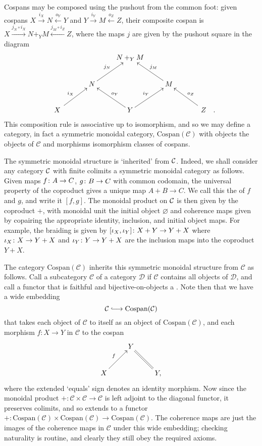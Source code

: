 Cospans may be composed using the pushout from the common
foot: given cospans $X \stackrel{i_X}{\longrightarrow} N
\stackrel{o_Y}{\longleftarrow} Y$ and $Y \stackrel{i_Y}{\longrightarrow} M
\stackrel{o_Z}{\longleftarrow} Z$, their composite cospan is $X \xrightarrow{j_N
\circ i_X} N+_YM \xleftarrow{j_M\circ i_Z} Z$,
where the maps $j$ are given by the pushout square in the diagram
\[
  \xymatrix{
    && N+_YM \\
    & N \ar[ur]^{j_N} && M \ar[ul]_{j_M} \\
    \quad X \quad \ar[ur]^{i_X} && Y \ar[ul]_{o_Y} \ar[ur]^{i_Y} && \quad Z
    \quad \ar[ul]_{o_Z}.
  }
\]
This composition rule is associative up to isomorphism, and
so we may define a category, in fact a symmetric monoidal category,
$\mathrm{Cospan}(\mathcal C)$ with objects the objects of $\mathcal C$ and
morphisms isomorphism classes of cospans. 

The symmetric monoidal structure is `inherited' from $\mathcal C$. Indeed, we shall
consider any category $\mathcal C$ with finite colimits a symmetric monoidal category
as follows. Given maps $f {\colon} A \to C$, $g {\colon} B \to C$ with common
codomain, the universal property of the coproduct gives a unique map $A+B \to
C$. We call this the  of $f$ and $g$, and write it $[f,g]$. The
monoidal product on $\mathcal C$ is then given by the coproduct $+$, with monoidal
unit the initial object $\varnothing$ and coherence maps given by copairing the
appropriate identity, inclusion, and initial object maps. For example, the
braiding is given by $[\iota_X,\iota_Y]{\colon} X+Y \to Y+X$ where $\iota_X{\colon} X
\to Y+X$ and $\iota_Y{\colon} Y \to Y+X$ are the inclusion maps into the coproduct
$Y+X$.

The category $\mathrm{Cospan(\mathcal C)}$ inherits this symmetric monoidal
structure from $\mathcal C$ as follows. Call a subcategory $\mathcal C$ of a
category $\mathcal D$  if $\mathcal C$ contains all objects of
$\mathcal D$, and call a functor that is faithful and bijective-on-objects a
.  Note then that we have a wide embedding
\[
  \mathcal C \hooklongrightarrow \mathrm{Cospan(\mathcal C)}
\]
that takes each object of $\mathcal C$ to itself as an object of
$\mathrm{Cospan(\mathcal C)}$, and each morphism $f\colon  X \to Y$ in $\mathcal
C$ to the cospan
\[
  \xymatrix{
    & Y \\
    X \ar[ur]^{f} && Y, \ar@{=}[ul]
  }
\]
where the extended `equals' sign denotes an identity morphism. Now since the
monoidal product $+\colon \mathcal C \times \mathcal C \to \mathcal C$ is left
adjoint to the diagonal functor, it preserves colimits, and so extends to a
functor $+\colon \mathrm{Cospan(\mathcal C)} \times \mathrm{Cospan(\mathcal C)}
\to \mathrm{Cospan(\mathcal C)}$. The coherence maps are just the images of the
coherence maps in $\mathcal C$ under this wide embedding; checking naturality is
routine, and clearly they still obey the required axioms.

